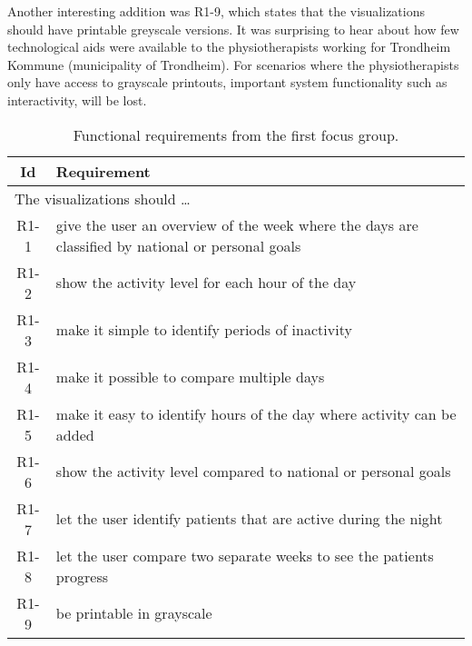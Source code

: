 Another interesting addition was R1-9, which states that the visualizations should have printable greyscale versions. It was surprising to hear about how few technological aids were available to the physiotherapists working for Trondheim Kommune (municipality of Trondheim). For scenarios where the physiotherapists only have access to grayscale printouts, important system functionality such as interactivity, will be lost.

\begin{table}[h!]
  \begin{center}
  \begin{tabular}{|c|p{12cm}|}
    \hline
      \textbf{Id} & \textbf{Requirement} \\ \hline
    \multicolumn{2}{|l|}{The visualizations should \ldots} \\ \hline
      R1-1 & give the user an overview of the week where the days are classified by national or personal goals \\ \hline
      R1-2 & show the activity level for each hour of the day \\ \hline
      R1-3 & make it simple to identify periods of inactivity \\ \hline
      R1-4 & make it possible to compare multiple days \\ \hline
      R1-5 & make it easy to identify hours of the day where activity can be added \\ \hline
      R1-6 & show the activity level compared to national or personal goals \\ \hline
      R1-7 & let the user identify patients that are active during the night \\ \hline
      R1-8 & let the user compare two separate weeks to see the patients progress \\ \hline
      R1-9 & be printable in grayscale \\ \hline
  \end{tabular}
  \end{center}
  \caption{Functional requirements from the first focus group.}
  \label{tab:f1Req}
\end{table}

